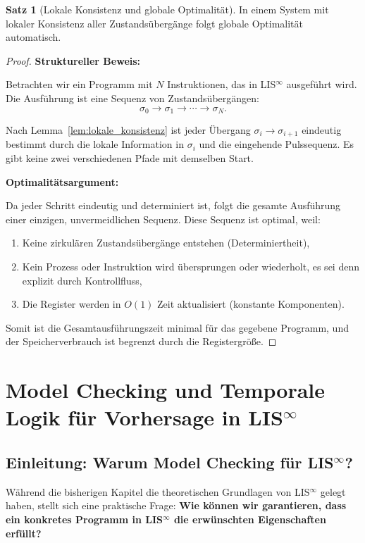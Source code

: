 \documentclass[a4paper,12pt]{article}
\theoremstyle{definition}
\newtheorem{satz}{Satz}
\begin{document}
\begin{satz}[Lokale Konsistenz und globale Optimalität]
	\label{satz:global_optimal}
	In einem System mit lokaler Konsistenz aller Zustandsübergänge folgt globale Optimalität automatisch.
\end{satz}

\begin{proof}
	\textbf{Struktureller Beweis:}
	
	Betrachten wir ein Programm mit $N$ Instruktionen, das in LIS$^{\infty}$ ausgeführt wird. Die Ausführung ist eine Sequenz von Zustandsübergängen:
	\[
	\sigma_0 \to \sigma_1 \to \cdots \to \sigma_N.
	\]
	
	Nach Lemma~\ref{lem:lokale_konsistenz} ist jeder Übergang $\sigma_i \to \sigma_{i+1}$ eindeutig bestimmt durch die lokale Information in $\sigma_i$ und die eingehende Pulssequenz. Es gibt keine zwei verschiedenen Pfade mit demselben Start.
	
	\textbf{Optimalitätsargument:}
	
	Da jeder Schritt eindeutig und determiniert ist, folgt die gesamte Ausführung einer einzigen, unvermeidlichen Sequenz. Diese Sequenz ist optimal, weil:
	\begin{enumerate}
		\item Keine zirkulären Zustandsübergänge entstehen (Determiniertheit),
		\item Kein Prozess oder Instruktion wird übersprungen oder wiederholt, es sei denn explizit durch Kontrollfluss,
		\item Die Register werden in $O(1)$ Zeit aktualisiert (konstante Komponenten).
	\end{enumerate}
	
	Somit ist die Gesamtausführungszeit minimal für das gegebene Programm, und der Speicherverbrauch ist begrenzt durch die Registergröße.
\end{proof}


\section{Model Checking und Temporale Logik für Vorhersage in LIS$^{\infty}$}
\label{sec:model_checking_temporale_logik}

\subsection{Einleitung: Warum Model Checking für LIS$^{\infty}$?}

Während die bisherigen Kapitel die theoretischen Grundlagen von LIS$^{\infty}$ gelegt haben, stellt sich eine praktische Frage: \textbf{Wie können wir garantieren, dass ein konkretes Programm in LIS$^{\infty}$ die erwünschten Eigenschaften erfüllt?}
\end{document}
